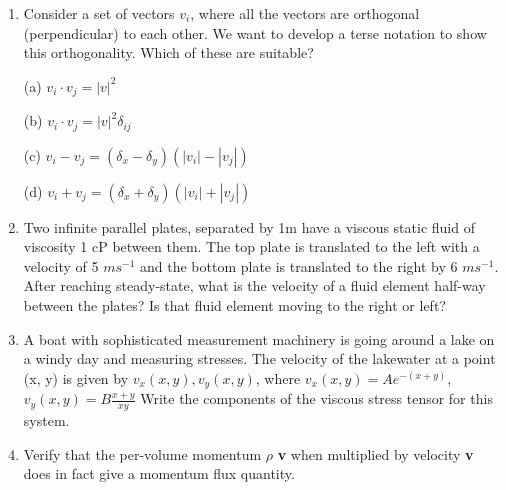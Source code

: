 \begin{enumerate}
    \item Consider a set of vectors {\textbf{$v_{i}$}}, where all the vectors are orthogonal (perpendicular) to each other. We want to develop a terse notation to show this orthogonality. Which of these are suitable?

        (a) $v_{i} \cdot v_{j} = |v|^{2}$

        (b) $v_{i} \cdot v_{j} = |v|^{2} \delta_{ij}$

        (c) $v_{i} - v_{j} = (\delta_{x} - \delta_{y})(|v_{i}| - |v_{j}|)$ 

        (d) $v_{i} + v_{j} = (\delta_{x} + \delta_{y})(|v_{i}| + |v_{j}|)$

    \item Two infinite parallel plates, separated by 1m have a viscous static fluid of viscosity 1 cP between them. The top plate is translated to the left with a velocity of 5 $m s^{-1}$ and the bottom plate is translated to the right by 6 $m s^{-1}$. After reaching steady-state, what is the velocity of a fluid element half-way between the plates? Is that fluid element moving to the right or left?

    \item A boat with sophisticated measurement machinery is going around a lake on a windy day and measuring stresses. The velocity of the lakewater at a point (x, y) is given by $v_{x}(x, y), v_{y}(x, y)$, where $v_{x}(x, y) = A e^{-(x+y)}$, $v_{y}(x,y) = B \frac{x + y}{xy}$ Write the components of the viscous stress tensor for this system. 

    \item Verify that the per-volume momentum $\rho$ \textbf{v} when multiplied by velocity \textbf{v} does in fact give a momentum flux quantity.

\end{enumerate}

